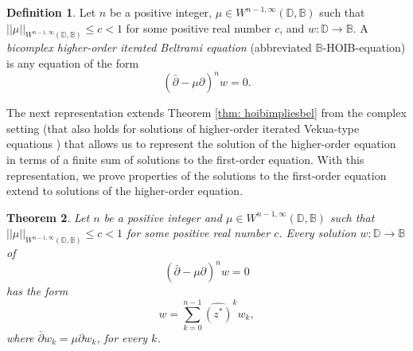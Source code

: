 \documentclass[12pt,reqno]{amsart}
\newtheorem{theorem}{Theorem}[section]
\theoremstyle{definition}
\newtheorem{deff}[theorem]{Definition}
\theoremstyle{remark}
\newcommand{\p}{\partial}
\newcommand{\dbar}{\bar\partial}
\newcommand{\bc}{\mathbb{B}}
\newcommand{\disk}{\mathbb{D}}
\begin{document}
\begin{deff}
Let $n$ be a positive integer, $\mu \in W^{n-1,\infty}(\disk,\bc)$ such that $||\mu||_{W^{n-1,\infty}(\disk,\bc)}\leq c < 1$ for some positive real number $c$, and $w : \disk\to\bc$. A \textit{bicomplex higher-order iterated Beltrami equation} (abbreviated $\bc$-HOIB-equation) is any equation of the form
     \[
        \left( \dbar - \mu\p \right)^n w  = 0.
     \]
\end{deff}

The next representation extends Theorem \ref{thm: hoibimpliesbel} from the complex setting (that also holds for solutions of higher-order iterated Vekua-type equations \cite{WBD, BCHoiv}) that allows us to represent the solution of the higher-order equation in terms of a finite sum of solutions to the first-order equation. With this representation, we prove properties of the solutions to the first-order equation extend to solutions of the higher-order equation.



\begin{theorem}\label{thm: hoibrep}
 Let $n$ be a positive integer and $\mu \in W^{n-1,\infty}(\disk,\bc)$ such that $||\mu||_{W^{n-1,\infty}(\disk,\bc)}\leq c < 1$ for some positive real number $c$. Every solution $w : \disk \to\bc$ of 
    \begin{equation}\label{bchigherbeltramiequation}
        \left( \dbar - \mu\p \right)^n w  = 0
    \end{equation}
    has the form 
    \begin{equation}\label{bchigherbeltramiequationrepresentation}
        w = \sum_{k=0}^{n-1} \widehat{ (z^*)}^k w_k,
    \end{equation}
    where $\dbar w_k = \mu \p w_k$, for every $k$. 
\end{theorem}
\end{document}
